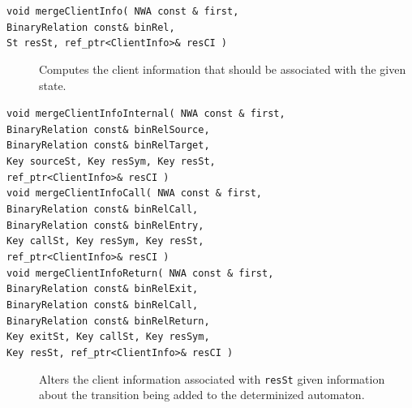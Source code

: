 \begin{description}

  \item[\texttt{void mergeClientInfo( NWA const \& first,\\ \hspace*{3.25cm}
    BinaryRelation const\& binRel,\\ \hspace*{3.25cm} St resSt,
    ref\_ptr<ClientInfo>\& resCI )}] \nopagebreak

    Computes the client information that should be associated with the given state.

  \item[\texttt{void mergeClientInfoInternal( NWA const \& first,\nopagebreak
    \\ \hspace*{3.25cm} BinaryRelation const\& binRelSource,\nopagebreak
    \\ \hspace*{3.25cm} BinaryRelation const\& binRelTarget, \nopagebreak
    \\ \hspace*{3.25cm} Key sourceSt, Key resSym, Key resSt, \nopagebreak
    \\ \hspace*{3.25cm} ref\_ptr<ClientInfo>\& resCI )}] \nopagebreak
  \item[\texttt{void mergeClientInfoCall( NWA const \&
    first,\\ \hspace*{3.25cm} BinaryRelation const\&
    binRelCall,\\ \hspace*{3.25cm} BinaryRelation const\&
    binRelEntry,\\ \hspace*{3.25cm} Key callSt, Key resSym, Key
    resSt,\\ \hspace*{3.25cm} ref\_ptr<ClientInfo>\& resCI )}] \nopagebreak
  \item[\texttt{void mergeClientInfoReturn( NWA const \&
    first,\\ \hspace*{3.25cm} BinaryRelation const\&
    binRelExit,\\ \hspace*{3.25cm} BinaryRelation const\&
    binRelCall,\\ \hspace*{3.25cm} BinaryRelation const\&
    binRelReturn,\\ \hspace*{3.25cm} Key exitSt, Key callSt, Key
    resSym,\\ \hspace*{3.25cm} Key resSt, ref\_ptr<ClientInfo>\& resCI )}]
    \nopagebreak

    Alters the client information associated with \texttt{resSt} given
    information about the transition being added to the determinized
    automaton.

\end{description}

